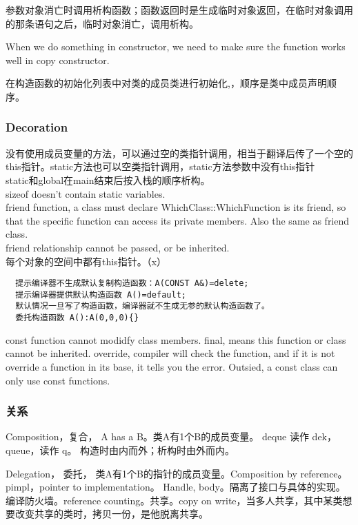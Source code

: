 \documentclass[UTF8]{../computerUniverse}
\begin{document}
参数对象消亡时调用析构函数；函数返回时是生成临时对象返回，在临时对象调用的那条语句之后，临时对象消亡，调用析构。

When we do something in constructor, we need to make sure the function works well in copy constructor.

在构造函数的初始化列表中对类的成员类进行初始化,，顺序是类中成员声明顺序。

\subsubsection{Decoration}
没有使用成员变量的方法，可以通过空的类指针调用，相当于翻译后传了一个空的this指针。static方法也可以空类指针调用，static方法参数中没有this指针 \\
static和global在main结束后按入栈的顺序析构。\\
sizeof doesn't contain static variables.\\
friend function, a class must declare WhichClass::WhichFunction is its friend, so that the specific function can access its private members. Also the same as friend class.\\
friend relationship cannot be passed, or be inherited.\\
每个对象的空间中都有this指针。（x）\\

\begin{lstlisting}
  提示编译器不生成默认复制构造函数：A(CONST A&)=delete;
  提示编译器提供默认构造函数 A()=default;
  默认情况一旦写了构造函数，编译器就不生成无参的默认构造函数了。
  委托构造函数 A():A(0,0,0){}
\end{lstlisting}

const function cannot modidfy class members. 
final, means this function or class cannot be inherited.
override, compiler will check the function, and if it is not override a function in its base, it tells you the error.
Outsied, a const class can only use const functions.



\subsubsection{关系}
Composition，复合， A has a B。类A有1个B的成员变量。
deque 读作 dek， queue，读作 q。
构造时由内而外；析构时由外而内。

Delegation， 委托， 类A有1个B的指针的成员变量。Composition by reference。pimpl，pointer to implementation。 Handle, body。隔离了接口与具体的实现。编译防火墙。reference counting。共享。copy on write，当多人共享，其中某类想要改变共享的类时，拷贝一份，是他脱离共享。
\end{document}
